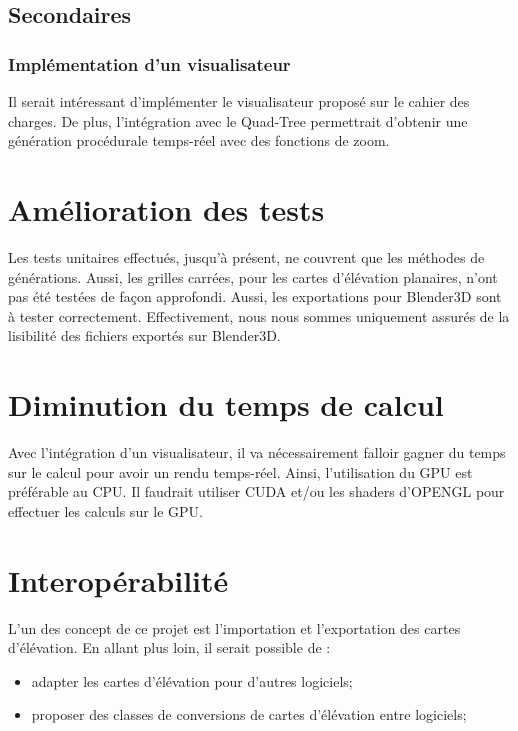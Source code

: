 \subsection{Secondaires}

\subsubsection{Implémentation d'un visualisateur}
Il serait intéressant d'implémenter le visualisateur proposé sur le cahier des charges. De plus, 
l'intégration avec le Quad-Tree permettrait d'obtenir une génération procédurale temps-réel avec des fonctions de zoom.

\section{Amélioration des tests}
Les tests unitaires effectués, jusqu'à présent, ne couvrent que les méthodes de générations. Aussi, 
les grilles carrées, pour les cartes d'élévation planaires, n'ont pas été testées de façon approfondi. 
Aussi, les exportations pour Blender3D sont à tester correctement. Effectivement, nous nous sommes uniquement assurés 
de la lisibilité des fichiers exportés sur Blender3D.

\section{Diminution du temps de calcul}
Avec l'intégration d'un visualisateur, il va nécessairement falloir gagner du temps sur le calcul pour avoir un rendu temps-réel.
Ainsi, l'utilisation du GPU est préférable au CPU. Il faudrait utiliser CUDA et/ou les shaders d'OPENGL pour effectuer
les calculs sur le GPU.

\section{Interopérabilité}
L'un des concept de ce projet est l'importation et l'exportation des cartes d'élévation. En allant plus loin,
il serait possible de :
\begin{itemize}
 \item adapter les cartes d'élévation pour d'autres logiciels;
 \item proposer des classes de conversions de cartes d'élévation entre logiciels;
\end{itemize}
